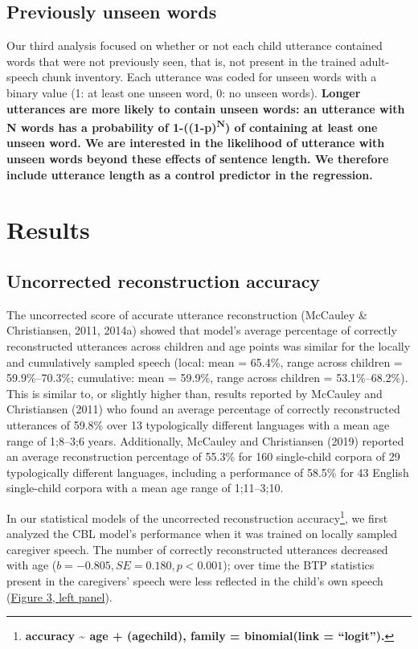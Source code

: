 \documentclass[man,mask,floatsintext]{apa6}
\let\rmarkdownfootnote\footnote%
\def\footnote{\protect\rmarkdownfootnote}
\begin{document}
\subsection{Previously unseen words}\label{previously-unseen-words}

Our third analysis focused on whether or not each child utterance
contained words that were not previously seen, that is, not present in
the trained adult-speech chunk inventory. Each utterance was coded for
unseen words with a binary value (1: at least one unseen word, 0: no
unseen words). \textbf{Longer utterances are more likely to contain
unseen words: an utterance with N words has a probability of
1-((1-p)\textsuperscript{N}) of containing at least one unseen word. We
are interested in the likelihood of utterance with unseen words beyond
these effects of sentence length. We therefore include utterance length
as a control predictor in the regression.}

\section{Results}\label{results}

\subsection{Uncorrected reconstruction
accuracy}\label{uncorrected-reconstruction-accuracy}

The uncorrected score of accurate utterance reconstruction (McCauley \&
Christiansen, 2011, 2014a) showed that model's average percentage of
correctly reconstructed utterances across children and age points was
similar for the locally and cumulatively sampled speech (local: mean =
65.4\%, range across children = 59.9\%--70.3\%; cumulative: mean =
59.9\%, range across children = 53.1\%--68.2\%). This is similar to, or
slightly higher than, results reported by McCauley and Christiansen
(2011) who found an average percentage of correctly reconstructed
utterances of 59.8\% over 13 typologically different languages with a
mean age range of 1;8--3;6 years. Additionally, McCauley and
Christiansen (2019) reported an average reconstruction percentage of
55.3\% for 160 single-child corpora of 29 typologically different
languages, including a performance of 58.5\% for 43 English single-child
corpora with a mean age range of 1;11--3;10.

In our statistical models of the uncorrected reconstruction
accuracy\footnote{\textbf{accuracy \textasciitilde{} age +
  (age\textbar{}child), family = binomial(link = \enquote{logit}).}}, we
first analyzed the CBL model's performance when it was trained on
locally sampled caregiver speech. The number of correctly reconstructed
utterances decreased with age (\(b = -0.805, SE = 0.180, p < 0.001\));
over time the BTP statistics present in the caregivers' speech were less
reflected in the child's own speech (\protect\hyperlink{fig3}{Figure 3,
left panel}).
\end{document}
